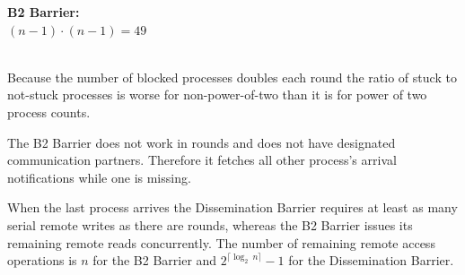 \documentclass[a4paper, 10pt]{article}
\begin{document}
\begin{table}[htbp]
\begin{minipage}{0.42\linewidth}
{	}
\end{minipage}
\begin{minipage}{0.42\linewidth}
	\vspace{0.3cm}
	\textbf{B2 Barrier:} \\
	$(n-1) \cdot (n-1) = 49$ \\
	\vspace{-0.1cm} \\
\end{minipage}
\label{tab:table-dissemination-progress}
\end{table}

Because the number of blocked processes doubles each round the ratio of stuck to not-stuck processes is worse for non-power-of-two than it is for power of two process counts.

The B2 Barrier does not work in rounds and does not have designated communication partners. Therefore it fetches all other process's arrival notifications while one is missing.

When the last process arrives the Dissemination Barrier requires at least as many serial remote writes as there are rounds, whereas the B2 Barrier issues its remaining remote reads concurrently. The number of remaining remote access operations is $n$ for the B2 Barrier and $2^{\lceil \log_2~n \rceil} - 1$ for the Dissemination Barrier.
\end{document}
